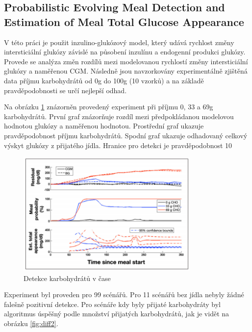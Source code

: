 \subsection{Probabilistic Evolving Meal Detection and Estimation of Meal Total Glucose Appearance \citep{Analyza.Diff}}
\label{ch:diff}

V této práci je použit inzulino-glukózový model, který udává rychlost změny intersticiální glukózy závislé na působení inzulínu a endogenní produkci glukózy. Provede se analýza změn rozdílů mezi modelovanou rychlostí změny intersticiální glukózy a naměřenou CGM. Následně jsou navzorkovány experimentálně zjištěná data příjmu karbohydrátů od 0g do 100g (10 vzorků) a na základě pravděpodobnosti se určí nejlepší odhad.

Na obrázku \ref{fig:diff1} znázorněn provedený experiment při příjmu 0, 33 a 69g karbohydrátů. První graf znázorňuje rozdíl mezi předpokládanou modelovou hodnotou glukózy a naměřenou hodnotou. Prostřední graf ukazuje pravděpodobnost příjmu karbohydrátů. Spodní graf ukazuje odhadovaný celkový výskyt glukózy z přijatého jídla. Hranice pro detekci je pravděpodobnost 10%

\begin{figure}[H]
\caption{Detekce karbohydrátů v čase}
\label{fig:diff1}
\includegraphics[width=0.8\textwidth]{img/analyza/diff1.png}
\end{figure}

Experiment byl proveden pro 99 scénářů. Pro 11 scénářů bez jídla nebyly žádné falešně pozitivní detekce. Pro scénáře kdy byly přijaté karbohydráty byl algoritmus úspěšný podle množství přijatých karbohydrátů, jak je vidět na obrázku \ref{fig:diff2}.

